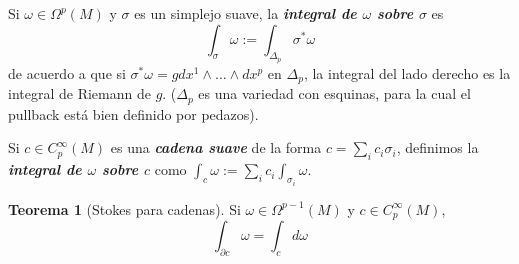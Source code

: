 \documentclass[spanish]{article}
\theoremstyle{definition}
\newtheorem*{teo}{Teorema}
\begin{document}
	Si $\omega\in\Omega^p(M)$ y $\sigma$ es un simplejo suave, la \textbf{\textit{integral de $\omega$ sobre $\sigma$}} es
	\[\int_\sigma \omega:=\int_{\Delta_p}\sigma^*\omega\]
	de acuerdo a que si $\sigma^*\omega=gdx^1\wedge\ldots\wedge dx^p$ en $\Delta_p$, la integral del lado derecho es la integral de Riemann de $g$. ($\Delta_p$ es una variedad con esquinas, para la cual el pullback está bien definido por pedazos).
	
	Si $c\in C_p^\infty(M)$ es una \textbf{\textit{cadena suave}} de la forma $c=\sum_ic_i\sigma_i$, definimos la \textbf{\textit{integral de $\omega$ sobre $c$}} como $\int_c\omega:=\sum_ic_i\int_{\sigma_i}\omega$.
	
	\begin{teo}[Stokes para cadenas]
		Si $\omega\in\Omega^{p-1}(M)$ y $c\in C^\infty_p(M)$,
		\[\int_{\partial c}\omega=\int_cd\omega\]
	\end{teo}
\end{document}

